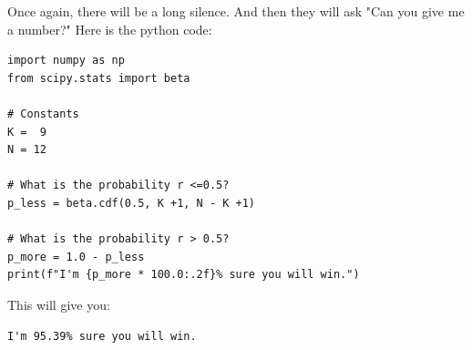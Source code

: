 Once again,  there will be a long silence.  And then they will ask "Can you give me a number?"  Here is the python code:

\begin{verbatim}
import numpy as np
from scipy.stats import beta

# Constants
K =  9
N = 12

# What is the probability r <=0.5?
p_less = beta.cdf(0.5, K +1, N - K +1)

# What is the probability r > 0.5?
p_more = 1.0 - p_less
print(f"I'm {p_more * 100.0:.2f}% sure you will win.")
\end{verbatim}

This will give you:
\begin{verbatim}
I'm 95.39% sure you will win.
\end{verbatim}






